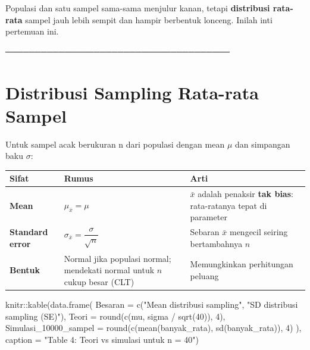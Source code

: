 \documentclass[
  indonesian,
  letterpaper,
]{book}
\newenvironment{Shaded}{\begin{snugshade}}{\end{snugshade}}
\newcommand{\AttributeTok}[1]{\textcolor[rgb]{0.40,0.45,0.13}{#1}}
\newcommand{\DecValTok}[1]{\textcolor[rgb]{0.68,0.00,0.00}{#1}}
\newcommand{\FunctionTok}[1]{\textcolor[rgb]{0.28,0.35,0.67}{#1}}
\newcommand{\NormalTok}[1]{\textcolor[rgb]{0.00,0.23,0.31}{#1}}
\newcommand{\SpecialCharTok}[1]{\textcolor[rgb]{0.37,0.37,0.37}{#1}}
\newcommand{\StringTok}[1]{\textcolor[rgb]{0.13,0.47,0.30}{#1}}
\newcounter{none} %
\begin{document}
Populasi dan satu sampel sama-sama menjulur kanan, tetapi
\textbf{distribusi rata-rata} sampel jauh lebih sempit dan hampir
berbentuk lonceng. Inilah inti pertemuan ini.

──────────────────────────────────────

\section{Distribusi Sampling Rata-rata
Sampel}\label{distribusi-sampling-rata-rata-sampel}

Untuk sampel acak berukuran n dari populasi dengan mean \(μ\) dan
simpangan baku \(σ\):

{\def\LTcaptype{none} %
\begin{longtable}[]{@{}
  >{\raggedright\arraybackslash}p{}
  >{\raggedright\arraybackslash}p{}
  >{\raggedright\arraybackslash}p{}@{}}
\toprule\noalign{}
\begin{minipage}[b]{\linewidth}\raggedright
Sifat
\end{minipage} & \begin{minipage}[b]{\linewidth}\raggedright
Rumus
\end{minipage} & \begin{minipage}[b]{\linewidth}\raggedright
Arti
\end{minipage} \\
\midrule\noalign{}
\endhead
\bottomrule\noalign{}
\endlastfoot
\textbf{Mean} & \(\mu_{\bar{x}} = \mu\) & \(\bar{x}\) adalah penaksir
\textbf{tak bias}: rata-ratanya tepat di parameter \\
\textbf{Standard error} &
\(\sigma_{\bar{x}} = \dfrac{\sigma}{\sqrt{n}}\) & Sebaran \(\bar{x}\)
mengecil seiring bertambahnya \(n\) \\
\textbf{Bentuk} & Normal jika populasi normal; mendekati normal untuk
\(n\) cukup besar (CLT) & Memungkinkan perhitungan peluang \\
\end{longtable}
}

\begin{Shaded}
\begin{Highlighting}[]
\NormalTok{knitr}\SpecialCharTok{::}\FunctionTok{kable}\NormalTok{(}\FunctionTok{data.frame}\NormalTok{(}
\AttributeTok{Besaran =} \FunctionTok{c}\NormalTok{(}\StringTok{"Mean distribusi sampling"}\NormalTok{, }\StringTok{"SD distribusi sampling (SE)"}\NormalTok{),}
\AttributeTok{Teori =} \FunctionTok{round}\NormalTok{(}\FunctionTok{c}\NormalTok{(mu, sigma }\SpecialCharTok{/} \FunctionTok{sqrt}\NormalTok{(}\DecValTok{40}\NormalTok{)), }\DecValTok{4}\NormalTok{),}
\AttributeTok{Simulasi\_10000\_sampel =} \FunctionTok{round}\NormalTok{(}\FunctionTok{c}\NormalTok{(}\FunctionTok{mean}\NormalTok{(banyak\_rata), }\FunctionTok{sd}\NormalTok{(banyak\_rata)), }\DecValTok{4}\NormalTok{)}
\NormalTok{), }\AttributeTok{caption =} \StringTok{"Table 4: Teori vs simulasi untuk n = 40"}\NormalTok{)}
\end{Highlighting}
\end{Shaded}
\end{document}
